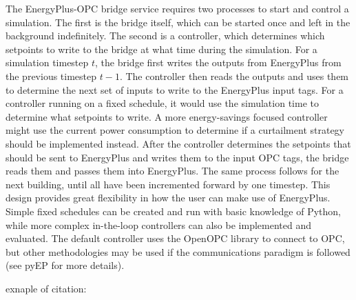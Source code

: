 The EnergyPlus-OPC bridge service requires two processes to start and control a simulation. The first is the bridge itself, which can be started once and left in the background indefinitely. The second is a controller, which determines which setpoints to write to the bridge at what time during the simulation. For a simulation timestep $t$, the bridge first writes the outputs from EnergyPlus from the previous timestep $t-1$. The controller then reads the outputs and uses them to determine the next set of inputs to write to the EnergyPlus input tags. For a controller running on a fixed schedule, it would use the simulation time to determine what setpoints to write. A more energy-savings focused controller might use the current power consumption to determine if a curtailment strategy should be implemented instead. After the controller determines the setpoints that should be sent to EnergyPlus and writes them to the input OPC tags, the bridge reads them and passes them into EnergyPlus. The same process follows for the next building, until all have been incremented forward by one timestep.
This design provides great flexibility in how the user can make use of EnergyPlus. Simple fixed schedules can be created and run with basic knowledge of Python, while more complex in-the-loop controllers can also be implemented and evaluated. The default controller uses the OpenOPC library to connect to OPC, but other methodologies may be used if the communications paradigm is followed (see pyEP for more details).




exnaple of citation: \cite{Camacho2013}